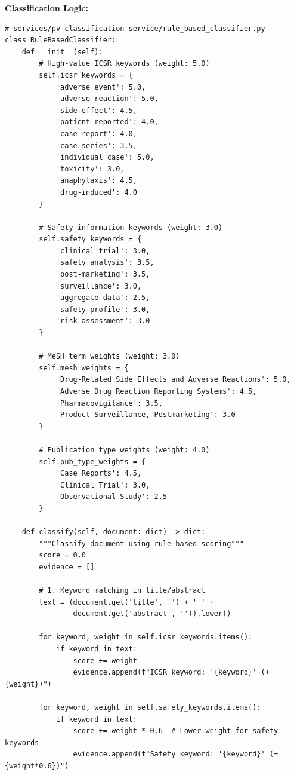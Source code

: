 \textbf{Classification Logic:}
\begin{lstlisting}[style=pythonstyle]
# services/pv-classification-service/rule_based_classifier.py
class RuleBasedClassifier:
    def __init__(self):
        # High-value ICSR keywords (weight: 5.0)
        self.icsr_keywords = {
            'adverse event': 5.0,
            'adverse reaction': 5.0,
            'side effect': 4.5,
            'patient reported': 4.0,
            'case report': 4.0,
            'case series': 3.5,
            'individual case': 5.0,
            'toxicity': 3.0,
            'anaphylaxis': 4.5,
            'drug-induced': 4.0
        }
        
        # Safety information keywords (weight: 3.0)
        self.safety_keywords = {
            'clinical trial': 3.0,
            'safety analysis': 3.5,
            'post-marketing': 3.5,
            'surveillance': 3.0,
            'aggregate data': 2.5,
            'safety profile': 3.0,
            'risk assessment': 3.0
        }
        
        # MeSH term weights (weight: 3.0)
        self.mesh_weights = {
            'Drug-Related Side Effects and Adverse Reactions': 5.0,
            'Adverse Drug Reaction Reporting Systems': 4.5,
            'Pharmacovigilance': 3.5,
            'Product Surveillance, Postmarketing': 3.0
        }
        
        # Publication type weights (weight: 4.0)
        self.pub_type_weights = {
            'Case Reports': 4.5,
            'Clinical Trial': 3.0,
            'Observational Study': 2.5
        }
    
    def classify(self, document: dict) -> dict:
        """Classify document using rule-based scoring"""
        score = 0.0
        evidence = []
        
        # 1. Keyword matching in title/abstract
        text = (document.get('title', '') + ' ' + 
                document.get('abstract', '')).lower()
        
        for keyword, weight in self.icsr_keywords.items():
            if keyword in text:
                score += weight
                evidence.append(f"ICSR keyword: '{keyword}' (+{weight})")
        
        for keyword, weight in self.safety_keywords.items():
            if keyword in text:
                score += weight * 0.6  # Lower weight for safety keywords
                evidence.append(f"Safety keyword: '{keyword}' (+{weight*0.6})")
        

\end{lstlisting}

